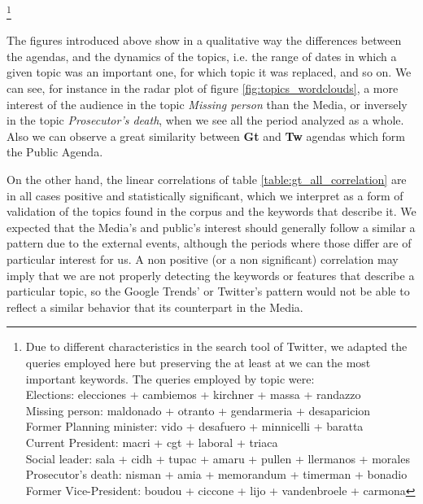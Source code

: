 \footnote{Due to different characteristics in the search tool of Twitter, we adapted the queries employed here but preserving the at least at we can the most important keywords. The queries employed by topic were: \\
Elections: elecciones + cambiemos + kirchner + massa + randazzo \\
Missing person: maldonado + otranto + gendarmeria + desaparicion \\
Former Planning minister: vido + desafuero + minnicelli + baratta \\
Current President: macri + cgt + laboral +  triaca \\
Social leader:  sala + cidh + tupac + amaru + pullen + llermanos + morales \\
Prosecutor’s death: nisman + amia + memorandum + timerman +  bonadio \\
Former Vice-President:  boudou + ciccone +  lijo + vandenbroele + carmona
}



\par The figures introduced above show in a qualitative way the differences between the agendas, and the dynamics of the topics, i.e. the range of dates in which a given topic was an important one, for which topic it was replaced, and so on. 
We can see, for instance in the radar plot of figure \ref{fig:topics_wordclouds}, a more interest of the audience in the topic \emph{Missing person} than the Media, or inversely in the topic \emph{Prosecutor's death}, when we see all the period analyzed as a whole. 
Also we can observe a great similarity between \textbf{Gt} and \textbf{Tw} agendas which form the Public Agenda.
\par On the other hand, the linear correlations of table \ref{table:gt_all_correlation} are in all cases positive and statistically significant, which we interpret as a form of validation of the topics found in the corpus and the keywords that describe it. 
We expected that the Media's and public's interest should generally follow a similar a pattern due to the external events, although the periods where those differ are of particular interest for us. 
A non positive (or a non significant) correlation may imply that we are not properly detecting the keywords or features that describe a particular topic, so the Google Trends' or Twitter's pattern would not be able to reflect a similar behavior that its counterpart in the Media.


